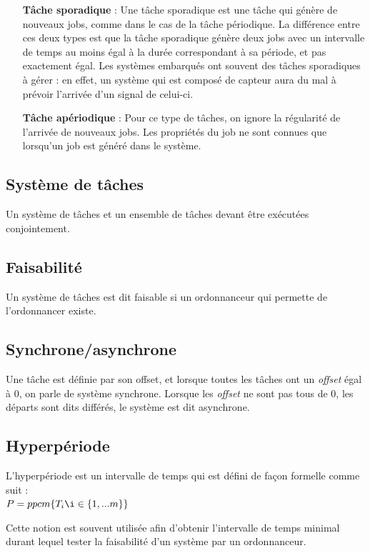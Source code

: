 \documentclass[11pt,a4paper,oneside]{report}
\begin{document}
\begin{itemize}
    \item[\textbf{Tâche sporadique}] : Une tâche sporadique est une tâche qui génère de nouveaux jobs, 
    comme dans le cas de la tâche périodique. 
    La différence entre ces deux types est que la tâche sporadique 
    génère deux jobs avec un intervalle de temps au moins égal à la durée correspondant à sa période, 
    et pas exactement égal. Les systèmes embarqués ont souvent des tâches sporadiques à gérer : 
    en effet, un système qui est composé de capteur aura du mal à prévoir l'arrivée d'un signal de 
    celui-ci. 
    
    \item[\textbf{Tâche apériodique}] : Pour ce type de tâches, on ignore la régularité de 
    l'arrivée de nouveaux jobs. Les propriétés du job ne sont connues que lorsqu'un job est 
    généré dans le système.
    
\end{itemize}

\subsection{Système de tâches}
Un système de tâches et un ensemble de tâches devant être exécutées conjointement. 

\subsection{Faisabilité}
Un système de tâches est dit faisable si un ordonnanceur qui permette de 
l'ordonnancer existe.

\subsection{Synchrone/asynchrone}
Une tâche est définie par son offset, et lorsque toutes les tâches ont un \textit{offset} égal à 0, on parle de 
système synchrone. Lorsque les \textit{offset} ne sont pas tous de 0, les départs sont dits différés, 
le système est dit asynchrone.

\subsection{Hyperpériode}
L'hyperpériode est un intervalle de temps qui est défini de façon formelle comme suit :\\
$P = ppcm\{T_i\i \in \{1,... m\}\}$

Cette notion est souvent utilisée afin d'obtenir l'intervalle de temps 
minimal durant lequel tester la faisabilité d'un système par un ordonnanceur.
\end{document}
